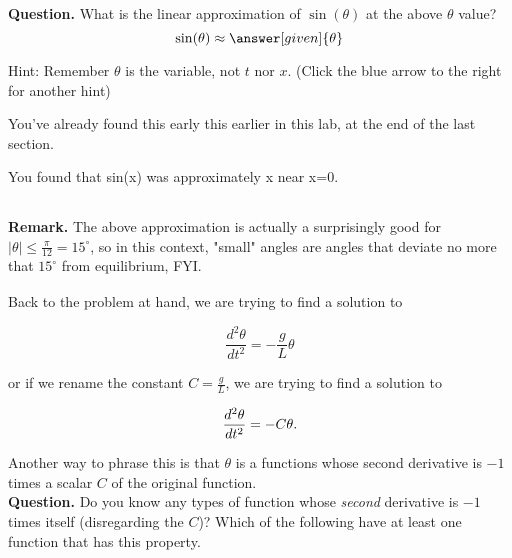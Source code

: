 \documentclass[handout,nooutcomes]{ximera}
\begin{document}
\begin{example}
\begin{explanation}
\textbf{Question. } What is the linear approximation of $\sin(\theta)$ at the above $\theta$ value?\\

\[
\sin(\theta) \approx \answer[given]{\theta}
\]


Hint: Remember $\theta$ is the variable, not $t$ nor $x$. (Click the blue arrow to
the right for another hint)\\

\begin{expandable}
You've already found this early this earlier in this lab, at the end of the last section.
\begin{expandable}
You found that sin(x) was approximately x near x=0.\\
\end{expandable}
\end{expandable}

$\phantom{.}$\\
\medskip

\textbf{Remark. } The above approximation is actually a surprisingly good for
$|\theta|\leq \frac{\pi}{12} = 15^\circ$, so in this context, "small" angles
are angles that deviate no more that $15^\circ$ from equilibrium, FYI.\\

$\phantom{.}$\\
\medskip

Back to the problem at hand, we are trying to find a solution to

\[
\dfrac{d^2 \theta}{d t^2}  = -\dfrac{g}{L} \theta
\]

or if we rename the constant $C=\frac{g}{L}$, we are trying to find a solution to

\[
\dfrac{d^2 \theta}{d t^2}  = -C \theta.\\
\]

Another way to phrase this is that $\theta$ is a functions whose
second derivative is $-1$ times a scalar $C$ of the original function.\\


\textbf{Question.}  Do you know any types of function whose \emph{second} derivative
is $-1$ times itself (disregarding the $C$)? Which of the following have at least one function that has this property.\\

\begin{selectAll}
\end{selectAll}


\end{explanation}
\end{example}
\end{document}

